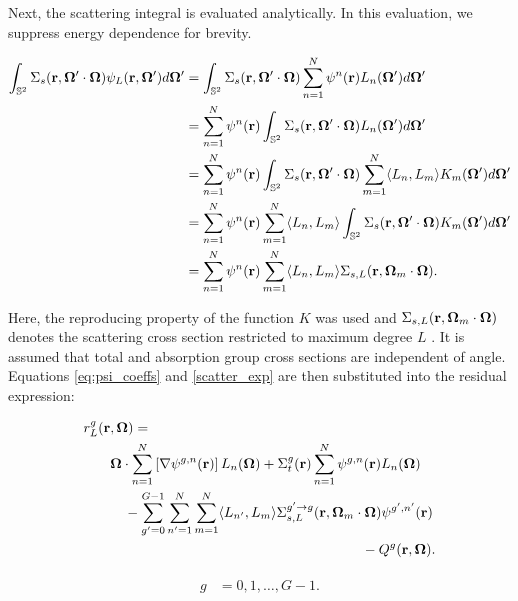 \noindent Next, the scattering integral is evaluated analytically. In this evaluation,
we suppress energy dependence for brevity.

\begin{align}
\begin{split}
\int_{\mathbb{S}^2}\Sigma_{s}(\textbf{r},\mathbf\Omega'\cdot\mathbf\Omega)
\psi_L(\textbf{r},\mathbf\Omega')d\mathbf\Omega' 
&= \int_{\mathbb{S}^2}\Sigma_{s}(\textbf{r},\mathbf\Omega'\cdot\mathbf\Omega)
\sum_{n=1}^{N}\psi^{n}(\textbf{r})L_n(\mathbf\Omega')d\mathbf\Omega' \\
&= \sum_{n=1}^{N}\psi^{n}(\textbf{r})
\int_{\mathbb{S}^2}\Sigma_{s}(\textbf{r},\mathbf\Omega'\cdot\mathbf\Omega)L_n(\mathbf\Omega')d\mathbf\Omega' \\
&= \sum_{n=1}^{N}\psi^{n}(\textbf{r})
\int_{\mathbb{S}^2}\Sigma_{s}(\textbf{r},\mathbf\Omega'\cdot\mathbf\Omega)
\sum_{m=1}^{N}\langle L_n, L_{m}\rangle K_{m}(\mathbf\Omega')d\mathbf\Omega' \\
&= \sum_{n=1}^{N}\psi^{n}(\textbf{r})
\sum_{m=1}^N\langle L_n, L_{m}\rangle
\int_{\mathbb{S}^2}\Sigma_{s}(\textbf{r},\mathbf\Omega'\cdot\mathbf\Omega)K_{m}(\mathbf\Omega')d\mathbf\Omega' \\
&= \sum_{n=1}^{N}\psi^{n}(\textbf{r})
\sum_{m=1}^N\langle L_n, L_{m}\rangle
\Sigma_{s,L}(\textbf{r},\mathbf\Omega_{m}\cdot\mathbf\Omega).
\label{scatter_exp}
\end{split}
\end{align}

\noindent Here, the reproducing property of the function $K$ was used and 
$\Sigma_{s,L}(\textbf{r},\mathbf\Omega_{m}\cdot\mathbf\Omega)$ denotes the scattering cross section
restricted to maximum degree $L$ \cite{ldoderiv}. It is assumed that total and absorption group
cross sections are independent of angle. Equations \ref{eq:psi_coeffs} and  
\ref{scatter_exp} are then substituted into the residual expression:

\noindent\begin{minipage}{0.7\textwidth}
\begin{align*}
r_L^g(\textbf{r}&,\mathbf\Omega) =\\ 
&\mathbf\Omega\cdot\sum_{n=1}^{N}\left[\nabla\psi^{g,n}(\textbf{r})\right]L_n(\mathbf\Omega) 
+ \Sigma_t^g(\textbf{r})\sum_{n=1}^{N}\psi^{g,n}(\textbf{r})L_n(\mathbf\Omega) \\
&\quad- \sum_{g'=0}^{G-1}\sum_{n'=1}^{N}\sum_{m=1}^{N}\langle L_{n'},L_{m}\rangle
\Sigma_{s,L}^{g'\rightarrow g}(\textbf{r},\mathbf\Omega_{m}\cdot\mathbf\Omega)\psi^{g',n'}(\textbf{r}) \\
&\qquad\qquad\qquad\qquad\qquad\qquad\qquad\qquad\qquad- Q^g(\textbf{r},\mathbf\Omega).
\end{align*}
\end{minipage}
\hspace{-0.5cm}
\begin{minipage}{0.3\textwidth}
\begin{align}
\begin{split}
g &= 0,1,\ldots,G-1.
\end{split}
\end{align}
\end{minipage}
\vspace{0.1cm}

